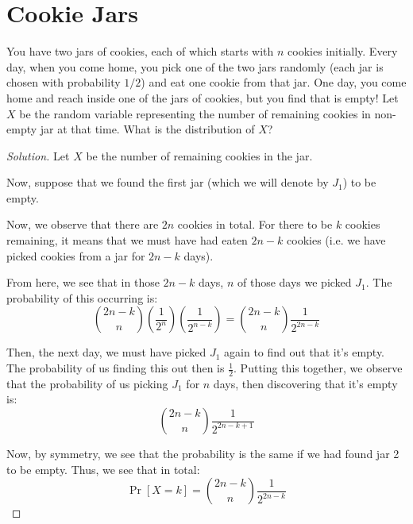 \documentclass{article}
\newenvironment{solution}{\begin{proof}[Solution]}{\end{proof}}
\begin{document}
\section{Cookie Jars}
\begin{hw}
	You have two jars of cookies, each of which starts with $n$ cookies initially.
	Every day, when you come home, you pick one of the two jars randomly (each jar is chosen with probability $1/2$) and eat one cookie from that jar.
	One day, you come home and reach inside one of the jars of cookies, but you find that is empty!
	Let $X$ be the random variable representing the number of remaining cookies in non-empty jar at that time.
	What is the distribution of $X$?
\end{hw}
\begin{solution}
	Let $X$ be the number of remaining cookies in the jar.
	
	Now, suppose that we found the first jar (which we will denote by $J_{1}$) to be empty.
	
	Now, we observe that there are $2n$ cookies in total. For there to be $k$ cookies remaining, it means that we must have had eaten $2n-k$ cookies (i.e. we have picked cookies from a jar for $2n-k$ days).
	
	From here, we see that in those $2n-k$ days, $n$ of those days we picked $J_{1}$. The probability of this occurring is:
	\begin{equation*}
		\binom{2n-k}{n}\left( \dfrac{1}{2^{n}} \right)\left( \dfrac{1}{2^{n-k}} \right) = \binom{2n-k}{n}\dfrac{1}{2^{2n-k}}
	\end{equation*}

	Then, the next day, we must have picked $J_{1}$ again to find out that it's empty. The probability of us finding this out then is $\frac{1}{2}$. Putting this together, we observe that the probability of us picking $J_{1}$ for $n$ days, then discovering that it's empty is:
	\begin{equation*}
		\binom{2n-k}{n}\dfrac{1}{2^{2n-k+1}}
	\end{equation*}

	Now, by symmetry, we see that the probability is the same if we had found jar 2 to be empty. Thus, we see that in total:
	\begin{equation*}
		\Pr[X = k] = \binom{2n-k}{n}\dfrac{1}{2^{2n-k}}
	\end{equation*}
\end{solution}

\newpage
\end{document}
